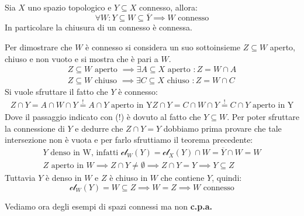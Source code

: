 \begin{theorema}~{}\label{chiusuraconnessa}\\
Sia $X$ uno spazio topologico e $Y\subseteq X$ connesso, allora:
		\begin{equation}
			\forall W \colon Y\subseteq W \subseteq \overline{Y} \implies W \text{ connesso}
		\end{equation}
	In particolare la chiusura di un connesso è connessa.
\end{theorema}
\begin{demonstration}
	Per dimostrare che $W$ è connesso si considera un suo sottoinsieme $Z\subseteq W$ aperto, chiuso e non vuoto e si mostra che è pari a $W$.
		\begin{gather*}
			Z\subseteq W \text{ aperto } \implies \exists A\subseteq X \text{ aperto } \colon Z=W\cap A \\
			Z\subseteq W \text{ chiuso } \implies \exists C\subseteq X \text{ chiuso } \colon Z=W\cap C
		\end{gather*}
	Si vuole sfruttare il fatto che $Y$ è connesso:
		\begin{gather*}
			Z\cap Y=A\cap W\cap Y \stackrel{!}{=} A\cap Y \text{ aperto in Y}
			Z\cap Y=C\cap W\cap Y \stackrel{!}{=} C\cap Y \text{ aperto in Y}
		\end{gather*}
	Dove il passaggio indicato con (!) è dovuto al fatto che $Y\subseteq W$. Per poter sfruttare la connessione di $Y$ e dedurre che $Z\cap Y=Y$ dobbiamo prima provare che tale intersezione non è vuota e per farlo sfruttiamo il teorema precedente:
		\begin{gather*}
			Y \text{ denso in W, infatti  } \mathcal{cl}_W(Y)=\mathcal{cl}_X(Y)\cap W=\overline{Y}\cap W=W\\
			Z \text{ aperto in } W \implies Z\cap Y \neq \emptyset \implies Z\cap Y=Y \implies Y\subseteq Z
		\end{gather*}
	Tuttavia $Y$ è denso in $W$ e $Z$ è chiuso in $W$ che contiene $Y$, quindi:
		\begin{equation*}
			\mathcal{cl}_W(Y)=W\subseteq Z \implies W=Z \implies W \text{ connesso}
		\end{equation*}
\end{demonstration}
Vediamo ora degli esempi di spazi connessi ma non \textbf{c.p.a.}
